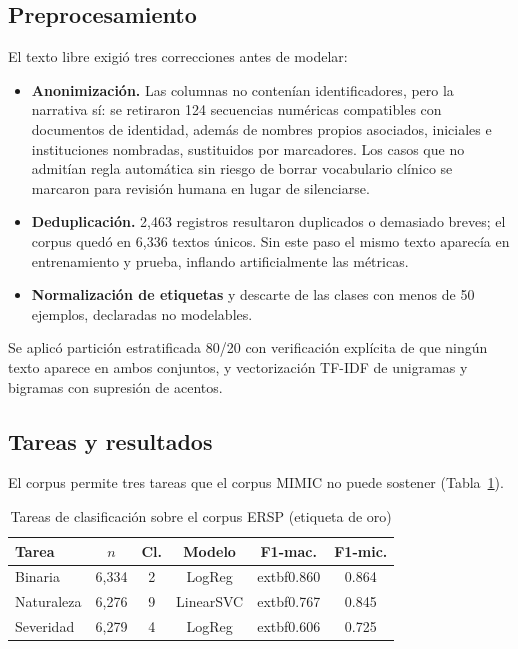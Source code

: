 \documentclass[conference]{IEEEtran}
\begin{document}
\subsection{Preprocesamiento}
El texto libre exigió tres correcciones antes de modelar:
\begin{itemize}
\item \textbf{Anonimización.} Las columnas no contenían identificadores, pero la
narrativa sí: se retiraron 124 secuencias numéricas
compatibles con documentos de identidad, además de nombres propios asociados,
iniciales e instituciones nombradas, sustituidos por marcadores. Los casos que
no admitían regla automática sin riesgo de borrar vocabulario clínico se
marcaron para revisión humana en lugar de silenciarse.
\item \textbf{Deduplicación.} 2,463
registros resultaron duplicados o demasiado breves; el corpus quedó en
6,336 textos únicos. Sin este paso el mismo texto aparecía en
entrenamiento y prueba, inflando artificialmente las métricas.
\item \textbf{Normalización de etiquetas} y descarte de las clases con menos de
50 ejemplos, declaradas no modelables.
\end{itemize}

Se aplicó partición estratificada 80/20 con verificación explícita de que
ningún texto aparece en ambos conjuntos, y vectorización TF-IDF de unigramas y
bigramas con supresión de acentos.

\subsection{Tareas y resultados}
El corpus permite tres tareas que el corpus MIMIC no puede sostener
(Tabla~\ref{tab:oe5}).

\begin{table}[htbp]
\caption{Tareas de clasificación sobre el corpus ERSP (etiqueta de oro)}
\label{tab:oe5}
\centering
\footnotesize
\begin{tabular}{@{}lccccc@{}}
\toprule
\textbf{Tarea} & \textbf{$n$} & \textbf{Cl.} & \textbf{Modelo} & \textbf{F1-mac.} & \textbf{F1-mic.} \\
\midrule
Binaria & 6,334 & 2 & LogReg & 	extbf{0.860} & 0.864 \\
Naturaleza & 6,276 & 9 & LinearSVC & 	extbf{0.767} & 0.845 \\
Severidad & 6,279 & 4 & LogReg & 	extbf{0.606} & 0.725 \\
\bottomrule
\end{tabular}
\end{table}
\end{document}
